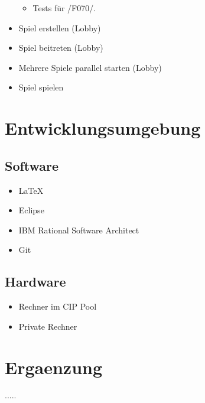 \documentclass{article}
\begin{document}
\begin{itemize}
\begin{itemize}
		\item Tests für /F070/. \\
			  
	\end{itemize}
	
	\item Spiel erstellen (Lobby)
	\item Spiel beitreten (Lobby)
	\item Mehrere Spiele parallel starten (Lobby)
	\item Spiel spielen 
\end{itemize}

\section{Entwicklungsumgebung}
\subsection{Software}
\begin{itemize}
	\item LaTeX
	\item Eclipse
	\item IBM Rational Software Architect
	\item Git
\end{itemize}

\subsection{Hardware}
\begin{itemize}
	\item Rechner im CIP Pool	
	\item Private Rechner
\end{itemize}

\section{Ergaenzung}
..... 
\newpage
\printglossaries
\end{document}
